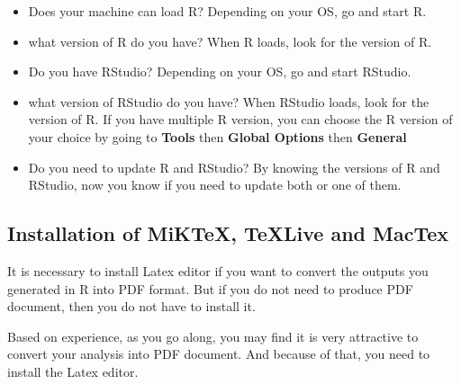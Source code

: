 \documentclass[
  10pt,
]{krantz}
\providecommand{\tightlist}{%
  \setlength{\itemsep}{0pt}\setlength{\parskip}{0pt}}
\begin{document}
\begin{itemize}
\tightlist
\item
  Does your machine can load R? Depending on your OS, go and start R.\\
\item
  what version of R do you have? When R loads, look for the version of R.
\item
  Do you have RStudio? Depending on your OS, go and start RStudio.
\item
  what version of RStudio do you have? When RStudio loads, look for the version of R. If you have multiple R version, you can choose the R version of your choice by going to \textbf{Tools} then \textbf{Global Options} then \textbf{General}
\item
  Do you need to update R and RStudio? By knowing the versions of R and RStudio, now you know if you need to update both or one of them.
\end{itemize}

\hypertarget{installation-of-miktex-texlive-and-mactex}{%
\subsection{Installation of MiKTeX, TeXLive and MacTex}\label{installation-of-miktex-texlive-and-mactex}}

It is necessary to install Latex editor if you want to convert the outputs you generated in R into PDF format. But if you do not need to produce PDF document, then you do not have to install it.

Based on experience, as you go along, you may find it is very attractive to convert your analysis into PDF document. And because of that, you need to install the Latex editor.
\end{document}
